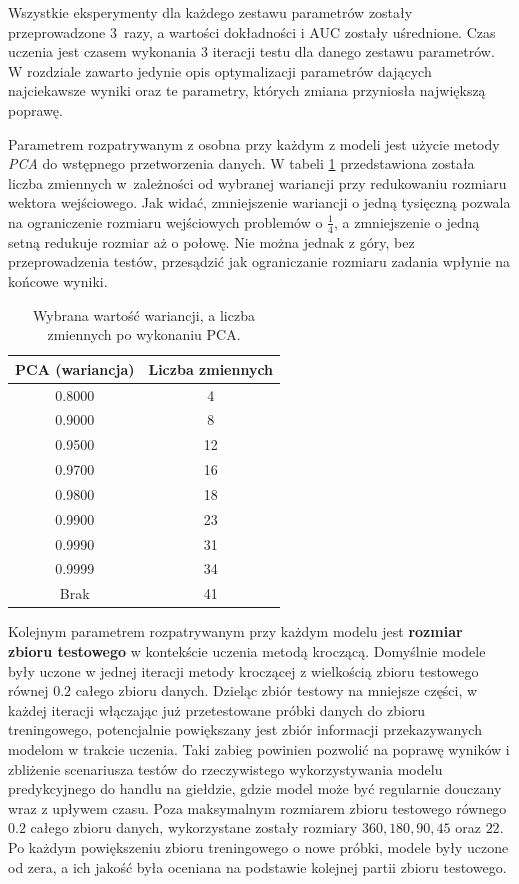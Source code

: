 \documentclass[a4paper, twoside, 11pt, openright]{article}
\begin{document}
Wszystkie eksperymenty dla każdego zestawu parametrów zostały przeprowadzone 3~razy, a wartości dokładności i AUC zostały uśrednione. Czas uczenia jest czasem wykonania 3 iteracji testu dla danego zestawu parametrów. W rozdziale zawarto jedynie opis optymalizacji parametrów dających najciekawsze wyniki oraz te parametry, których zmiana przyniosła największą poprawę.

\bigskip

Parametrem rozpatrywanym z osobna przy każdym z modeli jest użycie metody \textit{PCA} do wstępnego przetworzenia danych. W tabeli \ref{tab:pca_component_number} przedstawiona została liczba zmiennych w~zależności od wybranej wariancji przy redukowaniu rozmiaru wektora wejściowego. Jak widać, zmniejszenie wariancji o jedną tysięczną pozwala na ograniczenie rozmiaru wejściowych problemów o $\frac{1}{4}$, a zmniejszenie o jedną setną redukuje rozmiar aż o połowę. Nie można jednak z góry, bez przeprowadzenia testów, przesądzić jak ograniczanie rozmiaru zadania wpłynie na końcowe wyniki. 


\begin{table}[H]
    \centering
    \begin{tabular}{|c|c|}
    \hline
        \textbf{PCA (wariancja)} & \textbf{Liczba zmiennych} \\ \hline
        0.8000 & 4 \\ \hline 
        0.9000 & 8 \\ \hline 
        0.9500 & 12 \\ \hline 
        0.9700 & 16 \\ \hline 
        0.9800 & 18 \\ \hline 
        0.9900 & 23 \\ \hline
        0.9990 & 31 \\ \hline 
        0.9999 & 34 \\ \hline 
        Brak & 41 \\ \hline 
    \end{tabular}
    \caption{Wybrana wartość wariancji, a liczba zmiennych po wykonaniu PCA.}
    \label{tab:pca_component_number}
\end{table}

\bigskip

Kolejnym parametrem rozpatrywanym przy każdym modelu jest \textbf{rozmiar zbioru testowego} w kontekście uczenia metodą kroczącą. Domyślnie modele były uczone w jednej iteracji metody kroczącej z wielkością zbioru testowego równej $0.2$ całego zbioru danych. Dzieląc zbiór testowy na mniejsze części, w każdej iteracji włączając już przetestowane próbki danych do zbioru treningowego, potencjalnie powiększany jest zbiór informacji przekazywanych modelom w trakcie uczenia. Taki zabieg  powinien pozwolić na poprawę wyników i zbliżenie scenariusza testów do rzeczywistego wykorzystywania modelu predykcyjnego do handlu na giełdzie, gdzie model może być regularnie douczany wraz z upływem czasu. Poza maksymalnym rozmiarem zbioru testowego równego $0.2$ całego zbioru danych, wykorzystane zostały rozmiary $360, 180, 90, 45$ oraz $22$. Po każdym powiększeniu zbioru treningowego o nowe próbki, modele były uczone od zera, a ich jakość była oceniana na podstawie kolejnej partii zbioru testowego.
\end{document}
